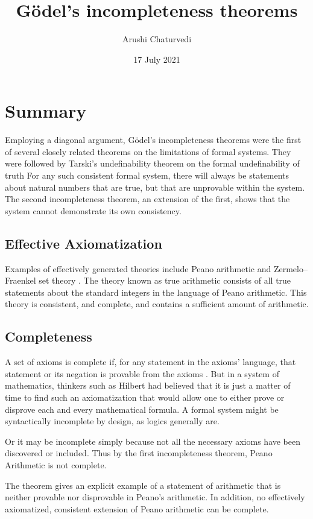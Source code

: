 \documentclass{article}
\title{Gödel's incompleteness theorems}
\author{Arushi Chaturvedi}
\date{ 17 July 2021}
\begin{document}
\maketitle

\section{Summary}
Employing a diagonal argument, Gödel's incompleteness theorems were the first of several closely related theorems on the limitations of formal systems. They were followed by Tarski's undefinability theorem on the formal undefinability of truth
For any such consistent formal system, there will always be statements about natural numbers that are true, but that are unprovable within the system.
The second incompleteness theorem, an extension of the first, shows that the system cannot demonstrate its own consistency.

\subsection{Effective Axiomatization}


Examples of effectively generated theories include Peano arithmetic and Zermelo–Fraenkel set theory . The theory known as true arithmetic consists of all true statements about the standard integers in the language of Peano arithmetic. This theory is consistent, and complete, and contains a sufficient amount of arithmetic.

\subsection{Completeness}

A set of axioms is complete if, for any statement in the axioms' language, that statement or its negation is provable from the axioms . But in a system of mathematics, thinkers such as Hilbert had believed that it is just a matter of time to find such an axiomatization that would allow one to either prove or disprove each and every mathematical formula. A formal system might be syntactically incomplete by design, as logics generally are.

Or it may be incomplete simply because not all the necessary axioms have been discovered or included.  Thus by the first incompleteness theorem, Peano Arithmetic is not complete.

The theorem gives an explicit example of a statement of arithmetic that is neither provable nor disprovable in Peano's arithmetic. In addition, no effectively axiomatized, consistent extension of Peano arithmetic can be complete.
\end{document}

